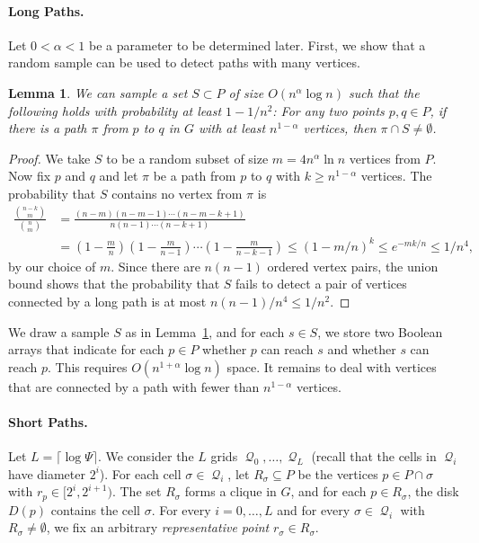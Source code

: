 \documentclass[11pt,a4paper]{paper}
\newtheorem{lemma}[theorem]{Lemma}
\DeclareMathOperator{\Q}{\mathcal{Q}}
\begin{document}
\paragraph*{Long Paths.}
Let $0 < \alpha < 1$ be a parameter to be
determined later.
First, we show that a random sample can be used to detect paths with
many vertices.

\begin{lemma}\label{lem:sampling}
We can sample a set $S \subset P$ of size $O(n^\alpha \log n)$ such that
the following holds with  probability
at least $1-1/n^2$: For any two points
$p,q \in P$, if there is a path $\pi$ from $p$ to $q$ in $G$ with
at least $n^{1-\alpha}$ vertices, then $\pi \cap S \neq \emptyset$.
\end{lemma}

\begin{proof}
We take $S$ to be a random subset of size
 $m = 4n^\alpha \ln n$ vertices from $P$.
Now fix $p$ and $q$ and let $\pi$ be a path from $p$ to $q$ with
$k \geq n^{1-\alpha}$ vertices.
The probability that $S$ contains no vertex from $\pi$ is
\begin{align*}
\frac{\binom{n-k}{m}}{\binom{n}{m}} & =\frac{(n-m)(n-m-1)\cdots(n-m-k+1)}{n(n-1)\cdots (n-k+1)}   \\
& = \left( 1-\frac{m}{n} \right) \left( 1-\frac{m}{n-1} \right) \cdots \left( 1-\frac{m}{n-k-1} \right) \le
(1 - m/n)^k \leq e^{-mk/n} \leq 1/n^4,
\end{align*} by our choice of $m$.
Since there are $n(n-1)$ ordered vertex pairs, the union bound
shows that the probability that $S$ fails to detect a pair of
vertices connected by a long path is at most
$n(n-1)/n^4 \leq 1/n^2$.
\end{proof}

We draw a sample $S$ as in Lemma~\ref{lem:sampling}, and for
each $s \in S$, we store two Boolean arrays that indicate for each
$p \in P$ whether $p$ can reach $s$ and whether $s$ can reach
$p$. This requires $O(n^{1+\alpha} \log n)$ space.
It remains to deal with vertices that are connected by a path with
fewer than $n^{1-\alpha}$ vertices.

\paragraph{Short Paths.}
Let $L = \lceil \log \Psi \rceil$. We consider the $L$ grids
$\Q_0,\dots,\Q_L$ (recall that the cells in $\Q_i$ have
diameter $2^i$). For each cell $\sigma \in \Q_i$, let
$R_\sigma \subseteq P$ be the vertices $p \in P \cap \sigma$ with $r_p \in
[2^i,2^{i+1})$.
The set $R_\sigma$ forms a clique in $G$, and for each
$p \in R_\sigma$, the disk $D(p)$ contains the cell
$\sigma$. For every $i = 0, \dots, L$ and for every $\sigma \in \Q_i$
with $R_\sigma \neq \emptyset$,
we fix an arbitrary  \emph{representative point}
$r_\sigma \in R_\sigma$.
\end{document}
